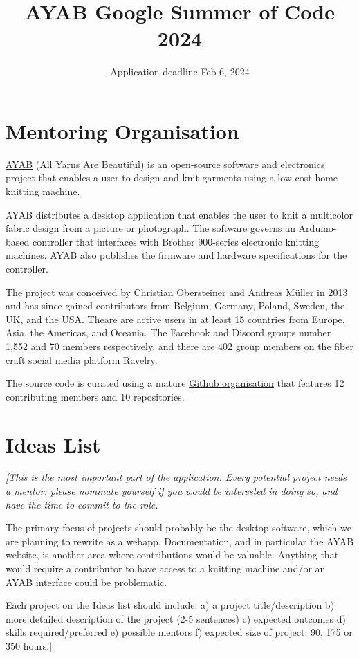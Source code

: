 \documentclass{article}
\title{AYAB Google Summer of Code 2024}
\author{Application deadline Feb 6, 2024}
\begin{document}
\maketitle

\section{Mentoring Organisation}

\href{https://ayab-knitting.com/}{AYAB} (All Yarns Are Beautiful) is an open-source software and electronics project that enables a user to design and knit garments using a low-cost home knitting machine. 

AYAB distributes a desktop application that enables the user to knit a multicolor fabric design from a picture or photograph. The software governs an Arduino-based controller that interfaces with Brother 900-series electronic knitting machines. AYAB also publishes the firmware and hardware specifications for the controller.

The project was conceived by Christian Obersteiner and Andreas M{\"u}ller in 2013 and has since gained contributors from Belgium, Germany, Poland, Sweden, the UK, and the USA. Theare are active users in at least 15 countries from Europe, Asia, the Americas, and Oceania. The Facebook and Discord groups number 1,552 and 70 members respectively, and there are 402 group members on the fiber craft social media platform Ravelry.

The source code is curated using a mature \href{https://github.com/AllYarnsAreBeautiful}{Github organisation} that features 12 contributing members and 10 repositories.

\section{Ideas List}

{\itshape
[This is the most important part of the application. Every potential project needs a mentor: please nominate yourself if you would be interested in doing so, and have the time to commit to the role.

The primary focus of projects should probably be the desktop software, which we are planning to rewrite as a webapp. Documentation, and in particular the AYAB website, is another area where contributions would be valuable. Anything that would require a contributor to have access to a knitting machine and/or an AYAB interface could be problematic.

Each project on the Ideas list should include: a) a project title/description b) more detailed description of the project (2-5 sentences) c) expected outcomes d) skills required/preferred e) possible mentors f) expected size of project: 90, 175 or 350 hours.]
}
\end{document}
